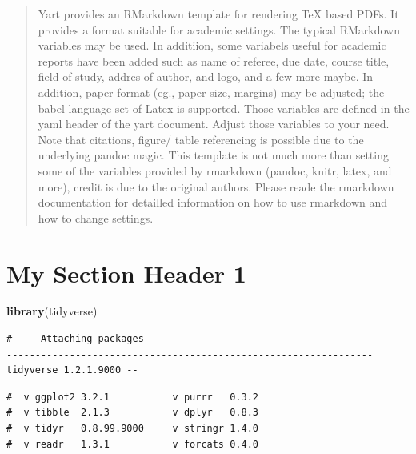 \documentclass[11pt,a4paper,oneside]{article}
\newenvironment{Shaded}{\begin{snugshade}}{\end{snugshade}}
\newcommand{\KeywordTok}[1]{\textcolor[rgb]{0.13,0.29,0.53}{\textbf{#1}}}
\newcommand{\NormalTok}[1]{#1}
\begin{document}
 \begin{abstract}
     Yart provides an RMarkdown template for rendering TeX based PDFs. It
     provides a format suitable for academic settings. The typical RMarkdown
     variables may be used. In additiion, some variabels useful for academic
     reports have been added such as name of referee, due date, course title,
     field of study, addres of author, and logo, and a few more maybe. In
     addition, paper format (eg., paper size, margins) may be adjusted; the
     babel language set of Latex is supported. Those variables are defined in
     the yaml header of the yart document. Adjust those variables to your
     need. Note that citations, figure/ table referencing is possible due to
     the underlying pandoc magic. This template is not much more than setting
     some of the variables provided by rmarkdown (pandoc, knitr, latex, and
     more), credit is due to the original authors. Please reade the rmarkdown
     documentation for detailled information on how to use rmarkdown and how
     to change settings.
 \end{abstract}
 \newpage




\newpage
\listoftables
\newpage
\listoffigures

{
\setcounter{tocdepth}{3}
\tableofcontents
}

\newpage
{}
\hypertarget{my-section-header-1}{%
\section{My Section Header 1}\label{my-section-header-1}}

\begin{Shaded}
\begin{Highlighting}[]
\KeywordTok{library}\NormalTok{(tidyverse)}
\end{Highlighting}
\end{Shaded}

\begin{verbatim}
#  -- Attaching packages ------------------------------------------------------------------------------------------------------------- tidyverse 1.2.1.9000 --
\end{verbatim}

\begin{verbatim}
#  v ggplot2 3.2.1           v purrr   0.3.2      
#  v tibble  2.1.3           v dplyr   0.8.3      
#  v tidyr   0.8.99.9000     v stringr 1.4.0      
#  v readr   1.3.1           v forcats 0.4.0
\end{verbatim}
\end{document}
